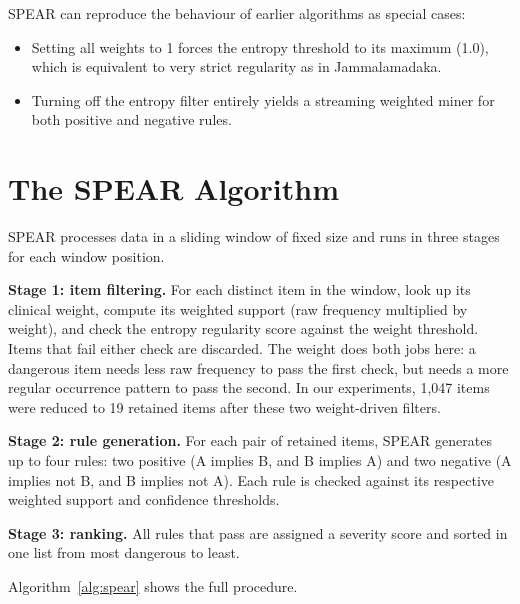 \documentclass[10pt,twocolumn]{article}
\begin{document}
SPEAR can reproduce the behaviour of earlier algorithms as special
cases:

\begin{itemize}[leftmargin=*]
  \item Setting all weights to 1 forces the entropy threshold to its
        maximum (1.0), which is equivalent to very strict regularity
        as in Jammalamadaka.
  \item Turning off the entropy filter entirely yields a streaming
        weighted miner for both positive and negative rules.
\end{itemize}

\section{The SPEAR Algorithm}
\label{sec:algorithm}

SPEAR processes data in a sliding window of fixed size and runs in
three stages for each window position.

\textbf{Stage 1: item filtering.}
For each distinct item in the window, look up its clinical weight,
compute its weighted support (raw frequency multiplied by weight),
and check the entropy regularity score against the weight threshold.
Items that fail either check are discarded. The weight does both
jobs here: a dangerous item needs less raw frequency to pass the
first check, but needs a more regular occurrence pattern to pass the
second. In our experiments, 1{,}047 items were reduced to 19
retained items after these two weight-driven filters.

\textbf{Stage 2: rule generation.}
For each pair of retained items, SPEAR generates up to four rules:
two positive (A implies B, and B implies A) and two negative (A
implies not B, and B implies not A). Each rule is checked against
its respective weighted support and confidence thresholds.

\textbf{Stage 3: ranking.}
All rules that pass are assigned a severity score and sorted in one
list from most dangerous to least.

Algorithm~\ref{alg:spear} shows the full procedure.
\end{document}
